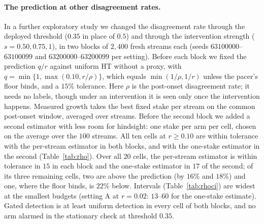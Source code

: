 \paragraph{The prediction at other disagreement rates.}
In a further exploratory study we changed the disagreement rate through the deployed threshold ($0.35$ in place of $0.5$) and through the intervention strength ($s=0.50,0.75,1$), in two blocks of $2{,}400$ fresh streams each (seeds $63100000$--$63100099$ and $63200000$--$63200099$ per setting).
Before each block we fixed the prediction $q/r$ against uniform HT without a proxy, with $q=\min\{1,\max(0.10,r/\rho)\}$, which equals $\min(1/\rho,1/r)$ unless the pacer's floor binds, and a $15\%$ tolerance.
Here $\rho$ is the post-onset disagreement rate; it needs no labels, though under an intervention it is seen only once the intervention happens.
Measured growth takes the best fixed stake per stream on the common post-onset window, averaged over streams.
Before the second block we added a second estimator with less room for hindsight: one stake per arm per cell, chosen on the average over the $100$ streams.
All ten cells at $r\ge0.10$ are within tolerance with the per-stream estimator in both blocks, and with the one-stake estimator in the second (Table~\ref{tab:rho}).
Over all $20$ cells, the per-stream estimator is within tolerance in $15$ in each block and the one-stake estimator in $17$ of the second;
of its three remaining cells, two are above the prediction (by $16\%$ and $18\%$) and one, where the floor binds, is $22\%$ below.
Intervals (Table~\ref{tab:rhoci}) are widest at the smallest budgets (setting A at $r=0.02$: $13$--$60$ for the one-stake estimate).
Gated detection is at least uniform detection in every cell of both blocks, and no arm alarmed in the stationary check at threshold $0.35$.

